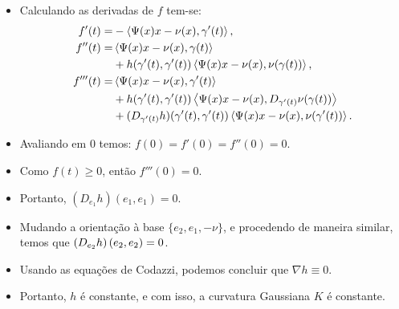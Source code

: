 \documentclass[12pt,a4paper]{beamer}
\theoremstyle{definition}
\begin{document}
\begin{frame}
	\begin{itemize}
		\item Calculando as derivadas de $f$ tem-se:
		\begin{align*}
		f'(t) =& -\left\langle \Psi(x)x - \nu(x),\gamma'(t) \right\rangle,\\
		f''(t) =& \left\langle \Psi(x)x - \nu(x),\gamma(t) \right\rangle\\
		& + h(\gamma'(t),\gamma'(t)) \left\langle \Psi(x)x - \nu(x),\nu(\gamma(t)) \right\rangle,\\
		f'''(t) =& \left\langle \Psi(x)x - \nu(x),\gamma'(t) \right\rangle\\
		& + h(\gamma'(t),\gamma'(t)) \left\langle \Psi(x)x - \nu(x),D_{\gamma'(t)} \nu(\gamma(t)) \right\rangle\\
		& + (D_{\gamma'(t)} h) (\gamma'(t),\gamma'(t)) \left\langle \Psi(x)x - \nu(x),\nu(\gamma'(t)) \right\rangle.
		\end{align*}
	\end{itemize}
\end{frame}

\begin{frame}
	\begin{itemize}
		\item Avaliando em $0$ temos: $f(0)=f'(0)=f''(0)=0$.
		
		\item Como $f(t) \geq 0$, então $f'''(0)=0$.
		
		\item Portanto, $(D_{e_1}h)(e_1,e_1)=0$.
		
		\item Mudando a orientação à base $\{ e_2, e_1, -\nu \}$, e procedendo de maneira similar, temos que $\left( D_{e_2}h \right) \left( e_2,e_2 \right)=0$.
		
		\item Usando as equações de Codazzi, podemos concluir que $\nabla h \equiv 0$.
		
		\item Portanto, $h$ é constante, e com isso, a curvatura Gaussiana $K$ é constante.
	\end{itemize}
\end{frame}
\end{document}
